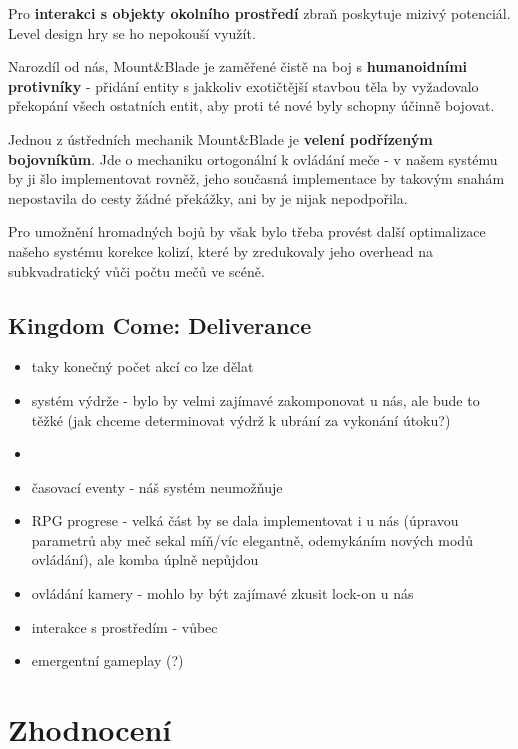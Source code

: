 Pro \textbf{interakci s objekty okolního prostředí} zbraň poskytuje mizivý potenciál. Level design hry se ho nepokouší využít.

Narozdíl od nás, Mount\&Blade je zaměřené čistě na boj s \textbf{humanoidními protivníky} - přidání entity s jakkoliv exotičtější stavbou těla by vyžadovalo překopání všech ostatních entit, aby proti té nové byly schopny účinně bojovat.


Jednou z ústředních mechanik Mount\&Blade je \textbf{velení podřízeným bojovníkům}. Jde o mechaniku ortogonální k ovládání meče - v našem systému by ji šlo implementovat rovněž, jeho současná implementace by takovým snahám nepostavila do cesty žádné překážky, ani by je nijak nepodpořila.

Pro umožnění hromadných bojů by však bylo třeba provést další optimalizace našeho systému korekce kolizí, které by zredukovaly jeho overhead na subkvadratický vůči počtu mečů ve scéně. 




\subsection{Kingdom Come: Deliverance}



\begin{itemize}
    \item taky konečný počet akcí co lze dělat
    \item systém výdrže - bylo by velmi zajímavé zakomponovat u nás, ale bude to těžké (jak chceme determinovat výdrž k ubrání za vykonání útoku?)
    \item 
    \item časovací eventy - náš systém neumožňuje
    \item RPG progrese - velká část by se dala implementovat i u nás (úpravou parametrů aby meč sekal míň/víc elegantně, odemykáním nových modů ovládání), ale komba úplně nepůjdou
    \item ovládání kamery - mohlo by být zajímavé zkusit lock-on u nás
    \item interakce s prostředím - vůbec
    \item emergentní gameplay (?) 
\end{itemize}

\section{Zhodnocení}

